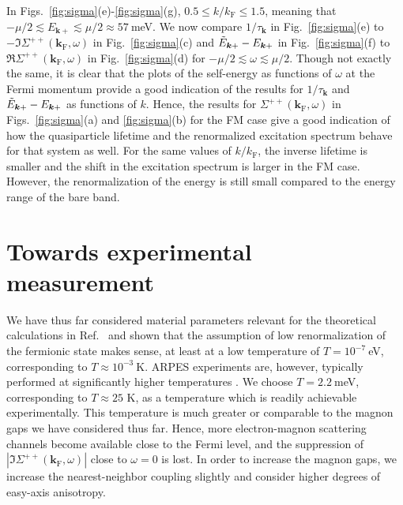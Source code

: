 \documentclass[aps, prb, twocolumn,amsmath,amssymb,floatfix]{revtex4-2}
\begin{document}
In Figs.~\ref{fig:sigma}(e)-\ref{fig:sigma}(g), $0.5 \leq k/k_{\textrm{F}} \leq 1.5$, meaning that $-\mu/2 \lesssim  E_{\boldsymbol{k}+} \lesssim \mu/2 \approx 57~$meV. 
We now compare $1/\tau_{\boldsymbol{k}}$ in Fig.~\ref{fig:sigma}(e) to $-\Im\Sigma^{++}(\boldsymbol{k}_{\textrm{F}}, \omega)$ in Fig.~\ref{fig:sigma}(c) and $\Tilde{E}_{\boldsymbol{k}+}-E_{\boldsymbol{k}+}$ in Fig.~\ref{fig:sigma}(f) to $\Re\Sigma^{++}(\boldsymbol{k}_{\textrm{F}}, \omega)$ in Fig.~\ref{fig:sigma}(d) for $-\mu/2 \lesssim  \omega \lesssim \mu/2$. 
Though not exactly the same, it is clear that the plots of the self-energy as functions of $\omega$ at the Fermi momentum provide a good indication of the results for $1/\tau_{\boldsymbol{k}}$ and $\Tilde{E}_{\boldsymbol{k}+}-E_{\boldsymbol{k}+}$ as functions of $k$. Hence, the results for $\Sigma^{++}(\boldsymbol{k}_{\textrm{F}}, \omega)$ in Figs.~\ref{fig:sigma}(a) and \ref{fig:sigma}(b) for the FM case give a good indication of how the quasiparticle lifetime and the renormalized excitation spectrum behave for that system as well. 
For the same values of $k/k_{\textrm{F}}$, the inverse lifetime is smaller and the shift in the excitation spectrum is larger in the FM case. However, the renormalization of the energy is still small compared to the energy range of the bare band.



\section{Towards experimental measurement} \label{sec:ARPES}
We have thus far considered material parameters relevant for the theoretical calculations in Ref.~\cite{EirikTIFMAFM} and shown that the assumption of low renormalization of the fermionic state makes sense, at least at a low temperature of $T = 10^{-7}~$eV, corresponding to $T \approx 10^{-3}~$K. ARPES experiments are, however, typically performed at significantly higher temperatures \cite{Claessen2004, Claessen2009, Borisenko2012one, Rosenzweig2020overdoping, Iwasawa2020high, Tamai2013spin, Rosenzweig2019tuning}. We choose $T = 2.2~$meV, corresponding to $T \approx 25$ K, as a temperature which is readily achievable experimentally. This temperature is much greater or comparable to the magnon gaps we have considered thus far. Hence, more electron-magnon scattering channels become available close to the Fermi level, and the suppression of $|\Im\Sigma^{++}(\boldsymbol{k}_{\textrm{F}}, \omega)|$ close to $\omega = 0$ is lost. In order to increase the magnon gaps, we increase the nearest-neighbor coupling slightly and consider higher degrees of easy-axis anisotropy. 
\end{document}
